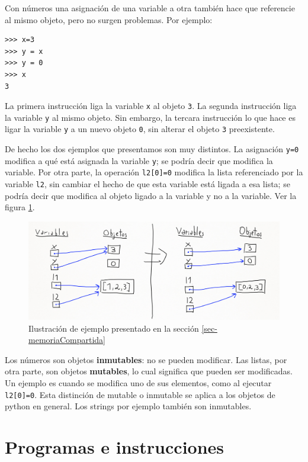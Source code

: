 \documentclass[a4paper, 12pt]{report}
\theoremstyle{definition}
\begin{document}
Con números una asignación de una variable a otra también hace que referencie al mismo objeto, pero no surgen problemas. Por ejemplo:
\begin{verbatim}
>>> x=3
>>> y = x
>>> y = 0
>>> x
3
\end{verbatim}
La primera instrucción liga la variable {\tt x} al objeto {\tt 3}. La segunda instrucción liga la variable {\tt y} al mismo objeto. Sin embargo, la tercara instrucción lo que hace es ligar la variable {\tt y} a un nuevo objeto {\tt 0}, sin alterar el objeto {\tt 3} preexistente.

De hecho los dos ejemplos que presentamos son muy distintos. La asignación {\tt y=0} modifica a qué está asignada la variable {\tt y}; se podría decir que modifica la variable. Por otra parte, la operación {\tt l2[0]=0} modifica la lista referenciado por la variable {\tt l2}, sin cambiar el hecho de que esta variable está ligada a esa lista; se podría decir que modifica al objeto ligado a la variable y no a la variable. Ver la figura \ref{fig-ejemploVarMem}.

\begin{figure}
	\centering
	\includegraphics[scale=0.3]{ejemploVarMem.png}
	\caption{Ilustración de ejemplo presentado en la sección \ref{sec-memoriaCompartida}}
	\label{fig-ejemploVarMem}
\end{figure}

Los números son objetos {\bf inmutables}: no se pueden modificar. Las listas, por otra parte, son objetos {\bf mutables}, lo cual significa que pueden ser modificadas. Un ejemplo es cuando se modifica uno de sus elementos, como al ejecutar {\tt l2[0]=0}. Esta distinción de mutable o inmutable se aplica a los objetos de python en general. Los strings por ejemplo también son inmutables.



\section{Programas e instrucciones}
\end{document}
